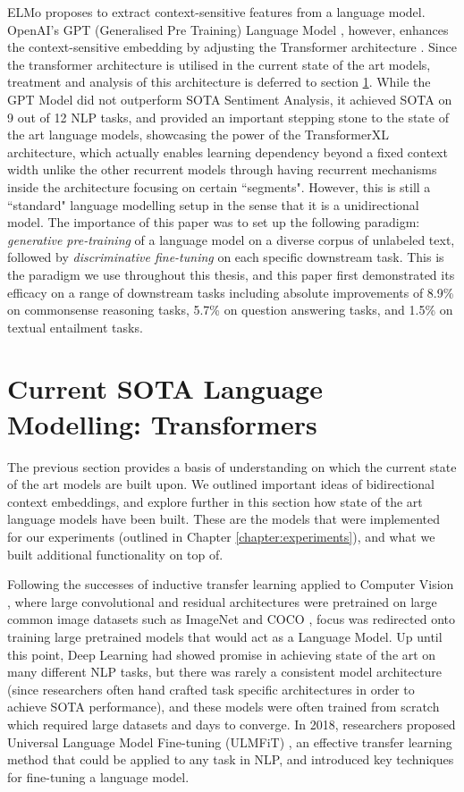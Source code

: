 {{ELMo \cite{Peters2018a} proposes to extract context-sensitive features from a language model. OpenAI's GPT (Generalised Pre Training) Language Model \cite{RadfordGPT}, however, enhances the context-sensitive embedding by adjusting the Transformer architecture \cite{Vaswani}. Since the transformer architecture is utilised in the current state of the art models, treatment and analysis of this architecture is deferred to section \ref{section:background:LMs}. While the GPT Model did not outperform SOTA Sentiment Analysis, it achieved SOTA on 9 out of 12 NLP tasks, and provided an important stepping stone to the state of the art language models, showcasing the power of the TransformerXL \cite{Dai2019} architecture, which actually enables learning dependency beyond a fixed context width unlike the other recurrent models through having recurrent mechanisms inside the architecture focusing on certain ``segments". However, this is still a ``standard" language modelling setup in the sense that it is a unidirectional model. The importance of this paper was to set up the following paradigm: \textit{generative pre-training} of a language model on a diverse corpus of unlabeled text, followed by \textit{discriminative fine-tuning} on each specific downstream task. This is the paradigm we use throughout this thesis, and this paper first demonstrated its efficacy on a range of downstream tasks including absolute improvements of 8.9\% on commonsense reasoning tasks, 5.7\% on question answering tasks, and 1.5\% on textual entailment tasks.

\section{Current SOTA Language Modelling: Transformers} \label{section:background:LMs}
The previous section provides a basis of understanding on which the current state of the art models are built upon. We outlined important ideas of bidirectional context embeddings, and explore further in this section how state of the art language models have been built. These are the models that were implemented for our experiments (outlined in Chapter \ref{chapter:experiments}), and what we built additional functionality on top of.

Following the successes of inductive transfer learning applied to Computer Vision \cite{He2015, Huang2016}, where large convolutional and residual architectures were pretrained on large common image datasets such as ImageNet \cite{ImageNet} and COCO \cite{COCO}, focus was redirected onto training large pretrained models that would act as a Language Model. Up until this point, Deep Learning had showed promise in achieving state of the art on many different NLP tasks, but there was rarely a consistent model architecture (since researchers often hand crafted task specific architectures in order to achieve SOTA performance), and these models were often trained from scratch which required large datasets and days to converge. In 2018, researchers proposed Universal Language Model Fine-tuning (ULMFiT) \cite{Howard2018}, an effective transfer learning method that could be applied to any task in NLP, and introduced key techniques for fine-tuning a language model.

}}
